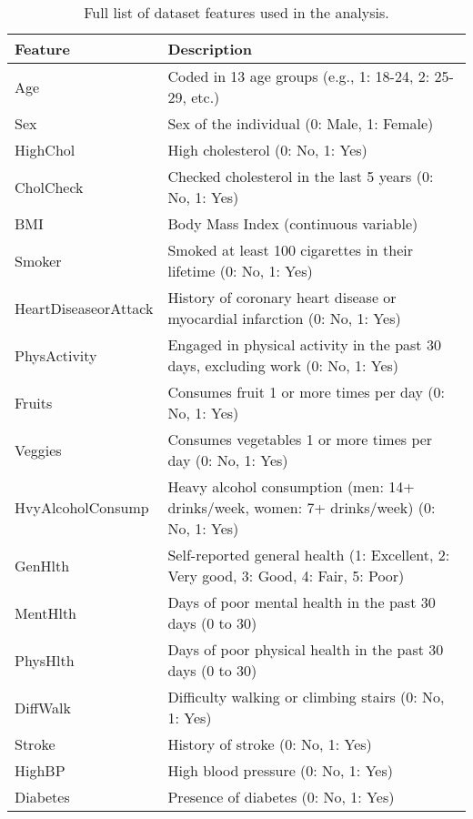 \documentclass[a4paper,12pt]{article}
\begin{document}
\begin{table}[h!]
    \centering
    \begin{tabularx}{\textwidth}{|l|X|}
    \hline
    \textbf{Feature} & \textbf{Description} \\ \hline
    Age & Coded in 13 age groups (e.g., 1: 18-24, 2: 25-29, etc.) \\ \hline
    Sex & Sex of the individual (0: Male, 1: Female) \\ \hline
    HighChol & High cholesterol (0: No, 1: Yes) \\ \hline
    CholCheck & Checked cholesterol in the last 5 years (0: No, 1: Yes) \\ \hline
    BMI & Body Mass Index (continuous variable) \\ \hline
    Smoker & Smoked at least 100 cigarettes in their lifetime (0: No, 1: Yes) \\ \hline
    HeartDiseaseorAttack & History of coronary heart disease or myocardial infarction (0: No, 1: Yes) \\ \hline
    PhysActivity & Engaged in physical activity in the past 30 days, excluding work (0: No, 1: Yes) \\ \hline
    Fruits & Consumes fruit 1 or more times per day (0: No, 1: Yes) \\ \hline
    Veggies & Consumes vegetables 1 or more times per day (0: No, 1: Yes) \\ \hline
    HvyAlcoholConsump & Heavy alcohol consumption (men: 14+ drinks/week, women: 7+ drinks/week) (0: No, 1: Yes) \\ \hline
    GenHlth & Self-reported general health (1: Excellent, 2: Very good, 3: Good, 4: Fair, 5: Poor) \\ \hline
    MentHlth & Days of poor mental health in the past 30 days (0 to 30) \\ \hline
    PhysHlth & Days of poor physical health in the past 30 days (0 to 30) \\ \hline
    DiffWalk & Difficulty walking or climbing stairs (0: No, 1: Yes) \\ \hline
    Stroke & History of stroke (0: No, 1: Yes) \\ \hline
    HighBP & High blood pressure (0: No, 1: Yes) \\ \hline
    Diabetes & Presence of diabetes (0: No, 1: Yes) \\ \hline
    \end{tabularx}
    \caption{Full list of dataset features used in the analysis.}
    \label{tab:feature_list}
\end{table}


\printbibliography
\end{document}

